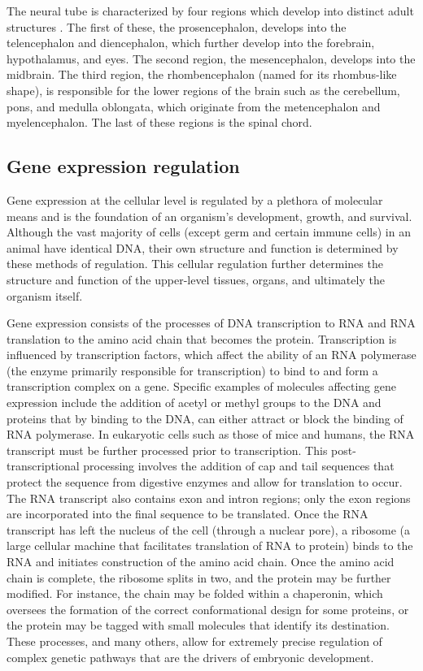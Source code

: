 \documentclass[12pt,oneside,onecolumn,a4paper]{article}
\begin{document}
The neural tube is characterized by four regions which develop into distinct adult structures \citep{Bakken_2015}. The first of these, the prosencephalon, develops into the telencephalon and diencephalon, which further develop into the forebrain, hypothalamus, and eyes. The second region, the mesencephalon, develops into the midbrain. The third region, the rhombencephalon (named for its rhombus-like shape), is responsible for the lower regions of the brain such as the cerebellum, pons, and medulla oblongata, which originate from the metencephalon and myelencephalon. The last of these regions is the spinal chord.

\subsection{Gene expression regulation}\label{regulation}
Gene expression at the cellular level is regulated by a plethora of molecular means and is the foundation of an organism's development, growth, and survival. Although the vast majority of cells (except germ and certain immune cells) in an animal have identical DNA, their own structure and function is determined by these methods of regulation. This cellular regulation further determines the structure and function of the upper-level tissues, organs, and ultimately the organism itself. 

Gene expression consists of the processes of DNA transcription to RNA and RNA translation to the amino acid chain that becomes the protein. Transcription is influenced by transcription factors, which affect the ability of an RNA polymerase (the enzyme primarily responsible for transcription) to bind to and form a transcription complex on a gene. Specific examples of molecules affecting gene expression include the addition of acetyl or methyl groups to the DNA and proteins that by binding to the DNA, can either attract or block the binding of RNA polymerase. In eukaryotic cells such as those of mice and humans, the RNA transcript must be further processed prior to transcription. This post-transcriptional processing involves the addition of cap and tail sequences that protect the sequence from digestive enzymes and allow for translation to occur. The RNA transcript also contains exon and intron regions; only the exon regions are incorporated into the final sequence to be translated. Once the RNA transcript has left the nucleus of the cell (through a nuclear pore), a ribosome (a large cellular machine that facilitates translation of RNA to protein) binds to the RNA and initiates construction of the amino acid chain. Once the amino acid chain is complete, the ribosome splits in two, and the protein may be further modified. For instance, the chain may be folded within a chaperonin, which oversees the formation of the correct conformational design for some proteins, or the protein may be tagged with small molecules that identify its destination. These processes, and many others, allow for extremely precise regulation of complex genetic pathways that are the drivers of embryonic development.
\end{document}
